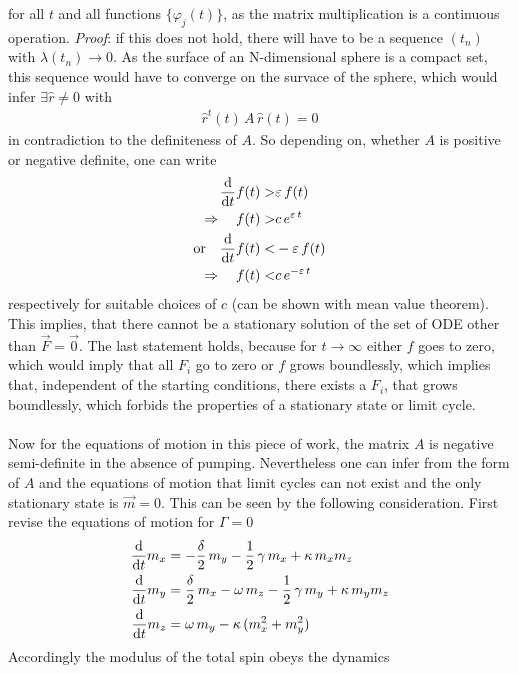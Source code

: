     for all $t$ and all functions $\{\varphi_j(t)\}$, as the matrix multiplication is a continuous operation. \textit{Proof}: if this does not hold, there will have to be a sequence $(t_n)$ with $\lambda(t_n)\rightarrow0$. As the surface of an N-dimensional sphere is a compact set, this sequence would have to converge on the survace of the sphere, which would infer $\exists \hat{r}\neq0$ with 
    \begin{align*}
        \hat{r}^t(t)\,A\,\hat{r}(t)=0
    \end{align*}
    in contradiction to the definiteness of $A$. So depending on, whether $A$ is positive or negative definite, one can write
    \begin{align*}
        \frac{\text{d}}{\text{d}t} f(t) >& \varepsilon\,f(t)\\
        \Rightarrow\quad f(t) >& c\,e^{\varepsilon\,t}\\
        \text{or}\quad \frac{\text{d}}{\text{d}t} f(t) <& -\varepsilon\,f(t)\\
        \Rightarrow\quad f(t) <& c\,e^{-\varepsilon\,t}\\
    \end{align*}
    respectively for suitable choices of $c$ (can be shown with mean value theorem). This implies, that there cannot be a stationary solution of the set of ODE other than $\vec{F}=\vec{0}$. The last statement holds, because for $t\rightarrow\infty$ either $f$ goes to zero, which would imply that all $F_i$ go to zero or $f$ grows boundlessly, which implies that, independent of the starting conditions, there exists a $F_i$, that grows boundlessly, which forbids the properties of a stationary state or limit cycle.\\\\Now for the equations of motion in this piece of work, the matrix $A$ is negative semi-definite in the absence of pumping. Nevertheless one can infer from the form of $A$ and the equations of motion that limit cycles can not exist and the only stationary state is $\vec{m}=0$. This can be seen by the following consideration. First revise the equations of motion for $\Gamma=0$
    \begin{align*}
        \frac{\text{d}}{\text{d}t} m_x &= -\frac{\delta}{2}\,m_y-\frac{1}{2}\,\gamma\,m_x+\kappa\,m_x m_z\\
        \frac{\text{d}}{\text{d}t} m_y &= \frac{\delta}{2}\,m_x-\omega\,m_z-\frac{1}{2}\,\gamma\,m_y+\kappa\,m_y m_z\\
        \frac{\text{d}}{\text{d}t} m_z &= \omega\,m_y - \kappa\,(m_x^2+m_y^2)
    \end{align*}
    Accordingly the modulus of the total spin obeys the dynamics
